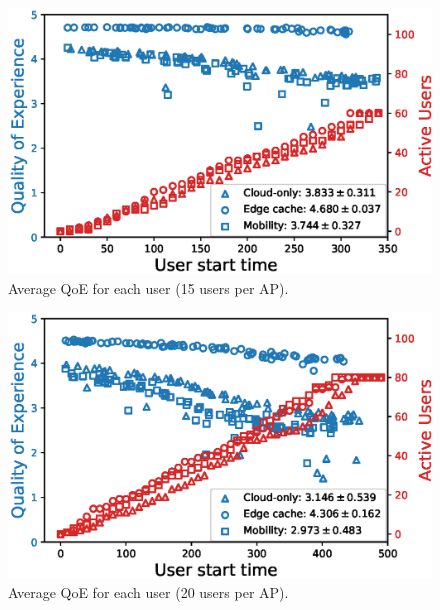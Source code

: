 \begin{figure}[!htb]
    \centering
    \includegraphics[width=\linewidth]{images/UserQoExUserStartTime15users-2.eps}
    \vspace{-0.4cm}
    \caption{Average QoE for each user (15 users per AP).}
    \label{fig:exp-setup-15}
\end{figure}

\begin{figure}[!htb]
    \centering
    \includegraphics[width=\linewidth]{images/UserQoExUserStartTime20users-2.eps}
    \vspace{-0.4cm}
    \caption{Average QoE for each user (20 users per AP).}
    \label{fig:exp-setup-20}
\end{figure}

